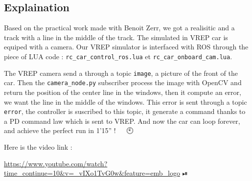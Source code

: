 \subsection{Explaination}

Based on the practical work made with Benoit Zerr, we got a realisitic and a track with a line in the middle of the track.
The simulated in VREP car is equiped with a camera. Our VREP simulator is interfaced with ROS through the piece of LUA code :
\texttt{rc\_car\_control\_ros.lua} et \texttt{rc\_car\_onboard\_cam.lua}.

The VREP camera send a through a topic \texttt{image}, a picture of the front of the car. 
Then the \texttt{camera\_node.py} subscriber process the image with OpenCV and return the position
of the center line in the windows, then it compute an error, we want the line in the middle of the windows. 
This error is sent through a topic \texttt{error}, the controller is suscribed to this topic,
it generate a command thanks to a PD command law which is sent to VREP. And now the car can loop forever, and achieve 
the perfect run in 1'15'' ! 🚙 🏁 🕙


Here is the video link : 


\tiny{\url{https://www.youtube.com/watch?time_continue=10&v=_vIXo1TvG0w&feature=emb_logo}} 
⏯

